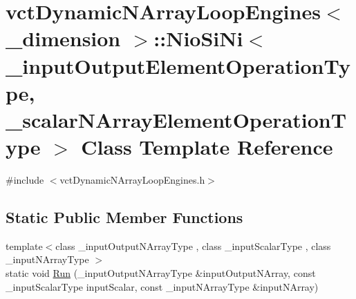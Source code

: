 \hypertarget{classvct_dynamic_n_array_loop_engines_1_1_nio_si_ni}{\section{vct\-Dynamic\-N\-Array\-Loop\-Engines$<$ \-\_\-dimension $>$\-:\-:Nio\-Si\-Ni$<$ \-\_\-input\-Output\-Element\-Operation\-Type, \-\_\-scalar\-N\-Array\-Element\-Operation\-Type $>$ Class Template Reference}
\label{classvct_dynamic_n_array_loop_engines_1_1_nio_si_ni}
}


{\ttfamily \#include $<$vct\-Dynamic\-N\-Array\-Loop\-Engines.\-h$>$}

\subsection*{Static Public Member Functions}
\begin{DoxyCompactItemize}
\item 
{\footnotesize template$<$class \-\_\-input\-Output\-N\-Array\-Type , class \-\_\-input\-Scalar\-Type , class \-\_\-input\-N\-Array\-Type $>$ }\\static void \hyperlink{classvct_dynamic_n_array_loop_engines_1_1_nio_si_ni_a8cec2625fb690437be4a497ebdf2cfe0}{Run} (\-\_\-input\-Output\-N\-Array\-Type \&input\-Output\-N\-Array, const \-\_\-input\-Scalar\-Type input\-Scalar, const \-\_\-input\-N\-Array\-Type \&input\-N\-Array)
\end{DoxyCompactItemize}


